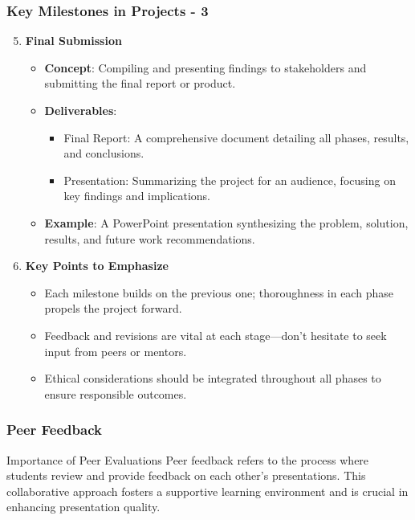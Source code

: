 \documentclass{beamer}
\begin{document}
\begin{frame}[fragile]
    \frametitle{Key Milestones in Projects - 3}
    \begin{enumerate}
        \setcounter{enumi}{4}  %
        \item \textbf{Final Submission}
            \begin{itemize}
                \item \textbf{Concept}: Compiling and presenting findings to stakeholders and submitting the final report or product.
                \item \textbf{Deliverables}:
                \begin{itemize}
                    \item Final Report: A comprehensive document detailing all phases, results, and conclusions.
                    \item Presentation: Summarizing the project for an audience, focusing on key findings and implications.
                \end{itemize}
                \item \textbf{Example}: A PowerPoint presentation synthesizing the problem, solution, results, and future work recommendations.
            \end{itemize}
        \item \textbf{Key Points to Emphasize}
            \begin{itemize}
                \item Each milestone builds on the previous one; thoroughness in each phase propels the project forward.
                \item Feedback and revisions are vital at each stage—don’t hesitate to seek input from peers or mentors.
                \item Ethical considerations should be integrated throughout all phases to ensure responsible outcomes.
            \end{itemize}
    \end{enumerate}
\end{frame}

\begin{frame}[fragile]
    \frametitle{Peer Feedback}
    \begin{block}{Importance of Peer Evaluations}
        Peer feedback refers to the process where students review and provide feedback on each other's presentations. This collaborative approach fosters a supportive learning environment and is crucial in enhancing presentation quality.
    \end{block}
\end{frame}
\end{document}
